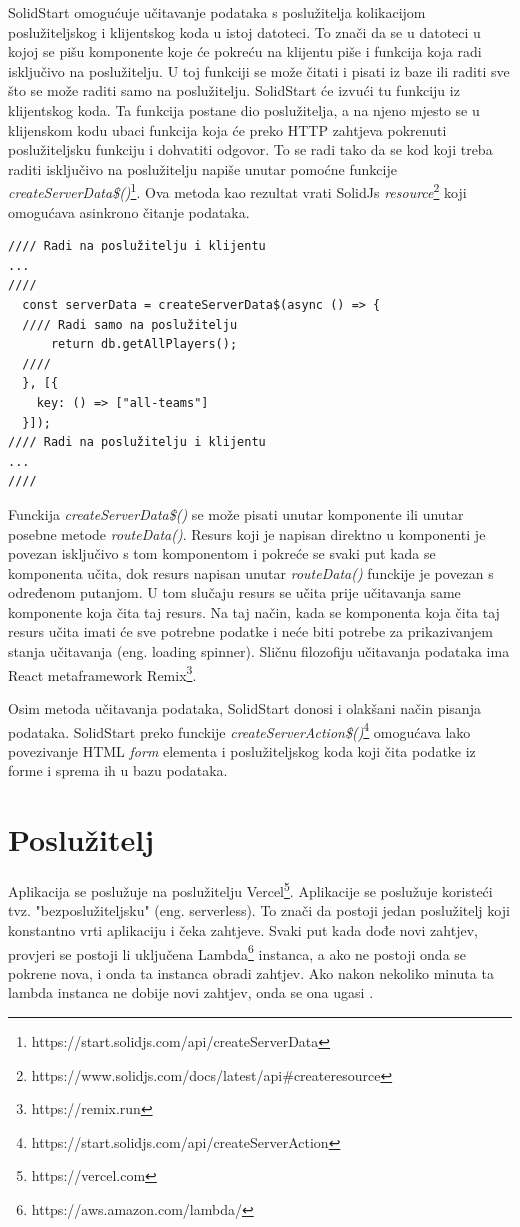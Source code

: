 \documentclass[times, utf8, zavrsni]{fer}
\begin{document}
SolidStart omogućuje učitavanje podataka s poslužitelja kolikacijom poslužiteljskog i klijentskog koda u istoj datoteci.
To znači da se u datoteci u kojoj se pišu komponente koje će pokreću na klijentu piše i funkcija koja radi isključivo na poslužitelju. U toj funkciji se može čitati i pisati iz baze ili raditi sve što se može raditi samo na poslužitelju.
SolidStart će izvući tu funkciju iz klijentskog koda. Ta funkcija postane dio poslužitelja, a na njeno mjesto se u klijenskom kodu ubaci funkcija koja će preko HTTP zahtjeva pokrenuti poslužiteljsku funkciju i dohvatiti odgovor.
To se radi tako da se kod koji treba raditi isključivo na poslužitelju napiše unutar pomoćne funkcije \emph{createServerData\$()}\footnote{https://start.solidjs.com/api/createServerData}.
Ova metoda kao rezultat vrati SolidJs \emph{resource}\footnote{https://www.solidjs.com/docs/latest/api#createresource} koji omogućava asinkrono čitanje podataka.

\begin{lstlisting}[caption=Učitavanje podataka s poslužitelja]
//// Radi na poslužitelju i klijentu
...
////
  const serverData = createServerData$(async () => {
  //// Radi samo na poslužitelju
      return db.getAllPlayers();
  ////
  }, [{
    key: () => ["all-teams"]
  }]);
//// Radi na poslužitelju i klijentu
...
////
\end{lstlisting}

Funckija \emph{createServerData\$()} se može pisati unutar komponente ili unutar posebne metode \emph{routeData()}.
Resurs koji je napisan direktno u komponenti je povezan isključivo s tom komponentom i pokreće se svaki put kada se komponenta učita, dok resurs napisan unutar \emph{routeData()} funckije je povezan s određenom putanjom.
U tom slučaju resurs se učita prije učitavanja same komponente koja čita taj resurs. Na taj način, kada se komponenta koja čita taj resurs učita imati će sve potrebne podatke i neće biti potrebe za prikazivanjem stanja učitavanja (eng. loading spinner).
Sličnu filozofiju učitavanja podataka ima React metaframework Remix\footnote{https://remix.run}.

Osim metoda učitavanja podataka, SolidStart donosi i olakšani način pisanja podataka.
SolidStart preko funckije \emph{createServerAction\$()}\footnote{https://start.solidjs.com/api/createServerAction} omogućava lako povezivanje HTML \emph{form} elementa i poslužiteljskog koda koji čita podatke iz forme i sprema ih u bazu podataka.

\section{Poslužitelj}
Aplikacija se poslužuje na poslužitelju Vercel\footnote{https://vercel.com}. Aplikacije se poslužuje koristeći tvz. "bezposlužiteljsku" (eng. serverless).
To znači da postoji jedan poslužitelj koji konstantno vrti aplikaciju i čeka zahtjeve. Svaki put kada dođe novi zahtjev, provjeri se postoji li uključena Lambda\footnote{https://aws.amazon.com/lambda/} instanca, a ako ne postoji onda se pokrene nova, i onda ta instanca obradi zahtjev.
Ako nakon nekoliko minuta ta lambda instanca ne dobije novi zahtjev, onda se ona ugasi \citep{serverless2022}.
\end{document}

